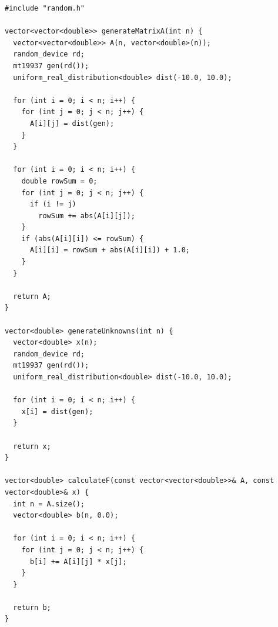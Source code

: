 \begin{lstlisting}[caption=Файл \texttt{random.cpp}]
#include "random.h"

vector<vector<double>> generateMatrixA(int n) {
  vector<vector<double>> A(n, vector<double>(n));
  random_device rd;
  mt19937 gen(rd());
  uniform_real_distribution<double> dist(-10.0, 10.0);

  for (int i = 0; i < n; i++) {
    for (int j = 0; j < n; j++) {
      A[i][j] = dist(gen);
    }
  }

  for (int i = 0; i < n; i++) {
    double rowSum = 0;
    for (int j = 0; j < n; j++) {
      if (i != j)
        rowSum += abs(A[i][j]);
    }
    if (abs(A[i][i]) <= rowSum) {
      A[i][i] = rowSum + abs(A[i][i]) + 1.0;
    }
  }

  return A;
}

vector<double> generateUnknowns(int n) {
  vector<double> x(n);
  random_device rd;
  mt19937 gen(rd());
  uniform_real_distribution<double> dist(-10.0, 10.0);

  for (int i = 0; i < n; i++) {
    x[i] = dist(gen);
  }

  return x;
}

vector<double> calculateF(const vector<vector<double>>& A, const vector<double>& x) {
  int n = A.size();
  vector<double> b(n, 0.0);

  for (int i = 0; i < n; i++) {
    for (int j = 0; j < n; j++) {
      b[i] += A[i][j] * x[j];
    }
  }

  return b;
}
\end{lstlisting}

